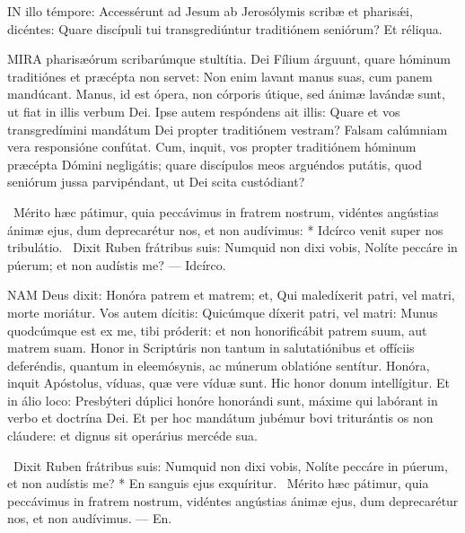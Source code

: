 
\lettrine[lines=2]{I}{N} illo témpore: Accessérunt ad Jesum ab Jerosólymis scribæ et pharisǽi, dicéntes: Quare discípuli tui transgrediúntur traditiónem seniórum? Et réliqua.



\lettrine[lines=2]{M}{IRA} pharisæórum scribarúmque stultítia. Dei Fílium árguunt, quare hóminum traditiónes et præcépta non servet: Non enim lavant manus suas, cum panem mandúcant. Manus, id est ópera, non córporis útique, sed ánimæ lavándæ sunt, ut fiat in illis verbum Dei. Ipse autem respóndens ait illis: Quare et vos transgredímini mandátum Dei propter traditiónem vestram? Falsam calúmniam vera responsióne confútat. Cum, inquit, vos propter traditiónem hóminum præcépta Dómini negligátis; quare discípulos meos arguéndos putátis, quod seniórum jussa parvipéndant, ut Dei scita custódiant?

\R\ Mérito hæc pátimur, quia peccávimus in fratrem nostrum, vidéntes angústias ánimæ ejus, dum deprecarétur nos, et non audívimus: * Idcírco venit super nos tribulátio. \V\ Dixit Ruben frátribus suis: Numquid non dixi vobis, Nolíte peccáre in púerum; et non audístis me? --- Idcírco.


\lettrine[lines=2]{N}{AM} Deus dixit: Honóra patrem et matrem; et, Qui maledíxerit patri, vel matri, morte moriátur. Vos autem dícitis: Quicúmque díxerit patri, vel matri: Munus quodcúmque est ex me, tibi próderit: et non honorificábit patrem suum, aut matrem suam. Honor in Scriptúris non tantum in salutatiónibus et offíciis deferéndis, quantum in eleemósynis, ac múnerum oblatióne sentítur. Honóra, inquit Apóstolus, víduas, quæ vere víduæ sunt. Hic honor donum intellígitur. Et in álio loco: Presbýteri dúplici honóre honorándi sunt, máxime qui labórant in verbo et doctrína Dei. Et per hoc mandátum jubémur bovi triturántis os non cláudere: et dignus sit operárius mercéde sua.

\R\ Dixit Ruben frátribus suis: Numquid non dixi vobis, Nolíte peccáre in púerum, et non audístis me? * En sanguis ejus exquíritur. \V\ Mérito hæc pátimur, quia peccávimus in fratrem nostrum, vidéntes angústias ánimæ ejus, dum deprecarétur nos, et non audívimus. --- En.


